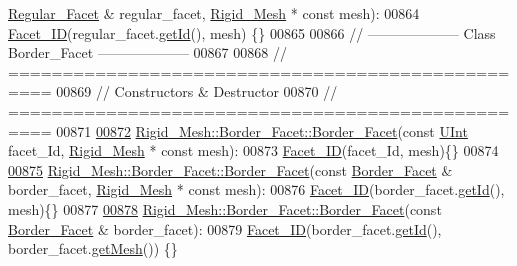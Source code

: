 \begin{DoxyCode}
      \hyperlink{classFVCode3D_1_1Rigid__Mesh_1_1Regular__Facet}{Regular\_Facet} & regular\_facet, \hyperlink{classFVCode3D_1_1Rigid__Mesh}{Rigid\_Mesh} * \textcolor{keyword}{const} mesh):
00864     \hyperlink{classFVCode3D_1_1Rigid__Mesh_1_1Facet__ID}{Facet\_ID}(regular\_facet.\hyperlink{classFVCode3D_1_1Rigid__Mesh_1_1Facet__ID_acf00cdd98ae92a84d82754d0d9878b64}{getId}(), mesh) \{\}
00865 
00866 \textcolor{comment}{// --------------------   Class Border\_Facet   --------------------}
00867 
00868 \textcolor{comment}{// ==================================================}
00869 \textcolor{comment}{// Constructors & Destructor}
00870 \textcolor{comment}{// ==================================================}
00871 
\hypertarget{RigidMesh_8cpp_source.tex_l00872}{}\hyperlink{classFVCode3D_1_1Rigid__Mesh_1_1Border__Facet_a0743c20fab3de8ce77c2143b14c3bfae}{00872} \hyperlink{classFVCode3D_1_1Rigid__Mesh_1_1Border__Facet_a0743c20fab3de8ce77c2143b14c3bfae}{Rigid\_Mesh::Border\_Facet::Border\_Facet}(\textcolor{keyword}{const} 
      \hyperlink{namespaceFVCode3D_a4bf7e328c75d0fd504050d040ebe9eda}{UInt} facet\_Id, \hyperlink{classFVCode3D_1_1Rigid__Mesh}{Rigid\_Mesh} * \textcolor{keyword}{const} mesh):
00873     \hyperlink{classFVCode3D_1_1Rigid__Mesh_1_1Facet__ID}{Facet\_ID}(facet\_Id, mesh)\{\}
00874 
\hypertarget{RigidMesh_8cpp_source.tex_l00875}{}\hyperlink{classFVCode3D_1_1Rigid__Mesh_1_1Border__Facet_ab50bc3e2dc770cb7490c85e548662996}{00875} \hyperlink{classFVCode3D_1_1Rigid__Mesh_1_1Border__Facet_a0743c20fab3de8ce77c2143b14c3bfae}{Rigid\_Mesh::Border\_Facet::Border\_Facet}(\textcolor{keyword}{const} 
      \hyperlink{classFVCode3D_1_1Rigid__Mesh_1_1Border__Facet}{Border\_Facet} & border\_facet, \hyperlink{classFVCode3D_1_1Rigid__Mesh}{Rigid\_Mesh} * \textcolor{keyword}{const} mesh):
00876     \hyperlink{classFVCode3D_1_1Rigid__Mesh_1_1Facet__ID}{Facet\_ID}(border\_facet.\hyperlink{classFVCode3D_1_1Rigid__Mesh_1_1Facet__ID_acf00cdd98ae92a84d82754d0d9878b64}{getId}(), mesh)\{\}
00877 
\hypertarget{RigidMesh_8cpp_source.tex_l00878}{}\hyperlink{classFVCode3D_1_1Rigid__Mesh_1_1Border__Facet_a55edda2483a7ba68ab73c1b920c0b553}{00878} \hyperlink{classFVCode3D_1_1Rigid__Mesh_1_1Border__Facet_a0743c20fab3de8ce77c2143b14c3bfae}{Rigid\_Mesh::Border\_Facet::Border\_Facet}(\textcolor{keyword}{const} 
      \hyperlink{classFVCode3D_1_1Rigid__Mesh_1_1Border__Facet}{Border\_Facet} & border\_facet):
00879     \hyperlink{classFVCode3D_1_1Rigid__Mesh_1_1Facet__ID}{Facet\_ID}(border\_facet.\hyperlink{classFVCode3D_1_1Rigid__Mesh_1_1Facet__ID_acf00cdd98ae92a84d82754d0d9878b64}{getId}(), border\_facet.\hyperlink{classFVCode3D_1_1Rigid__Mesh_1_1Facet__ID_a7c8237fc0d6d1706deef2dcd872b4480}{getMesh}()) \{\}

\end{DoxyCode}
